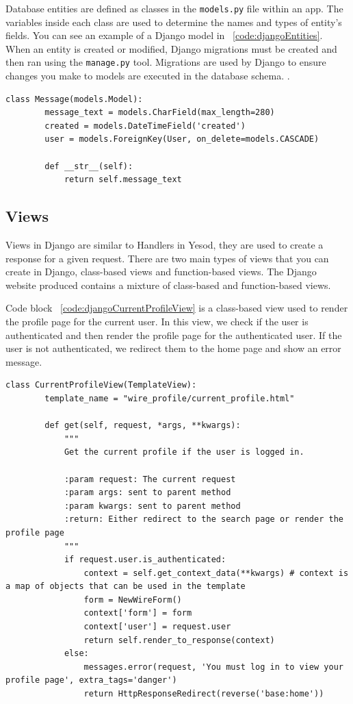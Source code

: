 Database entities are defined as classes in the \texttt{models.py} file within an app.
The variables inside
each class are used to determine the names and types of entity's fields. You can see
an example of a Django model in ~\ref{code:djangoEntities}. When an entity is created 
or modified, Django migrations must be created and then ran using the \texttt{manage.py} tool. 
Migrations are used by Django to ensure changes you make to models are executed in 
the database schema. \parencite{djangoMigrations}.

\begin{lstlisting}[caption={The user entity in Django},label={code:djangoEntities}]
	class Message(models.Model):
		message_text = models.CharField(max_length=280)
		created = models.DateTimeField('created')
		user = models.ForeignKey(User, on_delete=models.CASCADE)

		def __str__(self):
			return self.message_text
\end{lstlisting}

\subsection{Views}

Views in Django are similar to Handlers in Yesod, they are used to create
a response for a given request. There are two main types of views that you can
create in Django, class-based views and function-based views. The Django website
produced contains a mixture of class-based and function-based views.

Code block ~\ref{code:djangoCurrentProfileView} is a class-based view used to
render the profile page for the current user. In this view, we check if the
user is authenticated and then render the profile page for the authenticated
user. If the user is not authenticated, we redirect them to the home page and
show an error message.

\begin{lstlisting}[caption={Class-based current profile view},label={code:djangoCurrentProfileView}]
	class CurrentProfileView(TemplateView):
		template_name = "wire_profile/current_profile.html"

		def get(self, request, *args, **kwargs):
			"""
			Get the current profile if the user is logged in.

			:param request: The current request
			:param args: sent to parent method
			:param kwargs: sent to parent method
			:return: Either redirect to the search page or render the profile page
			"""
			if request.user.is_authenticated:
				context = self.get_context_data(**kwargs) # context is a map of objects that can be used in the template
				form = NewWireForm()
				context['form'] = form
				context['user'] = request.user
				return self.render_to_response(context)
			else:
				messages.error(request, 'You must log in to view your profile page', extra_tags='danger')
				return HttpResponseRedirect(reverse('base:home'))
\end{lstlisting}

